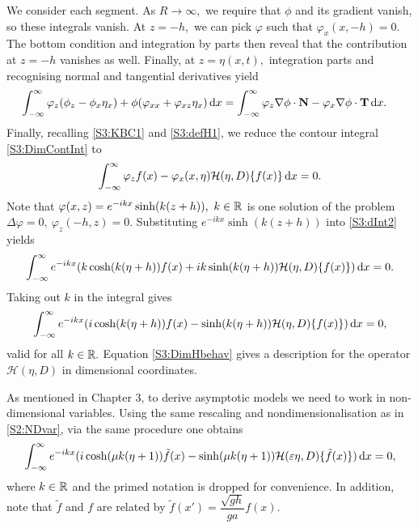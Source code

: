 We consider each segment. As $R \to \infty,$ we require that $\phi$ and its gradient vanish, so these integrals vanish. At $z = -h,$ we can pick $\varphi$ such that $\varphi_x(x, -h) = 0.$ The bottom condition and integration by parts then reveal that the contribution at $z = - h$ vanishes as well. Finally, at $z = \eta(x,t),$ integration parts and recognising normal and tangential derivatives yield
\begin{align*}
\int_{-\infty}^{\infty} \varphi_z(\phi_z &- \phi_x \eta_x) + \phi(\varphi_{xx}  +  \varphi_{xz} \eta_x) \,\mathrm{d} x = \int_{-\infty}^{\infty} \varphi_z \nabla \phi \cdot {\bf N} -\varphi_x \nabla \phi \cdot {\bf T} \,\mathrm{d} x.
\end{align*}
Finally, recalling \eqref{S3:KBC1} and \eqref{S3:defH1}, we reduce the contour integral \eqref{S3:DimContInt} to
\begin{equation}\label{S3:dInt2}
\int_{-\infty}^{\infty} \varphi_z f(x) -\varphi_x(x, \eta) \mathcal{H}( \eta, D)\{ f(x) \} \,\mathrm{d} x = 0.
\end{equation}
Note that $\varphi(x,z) = e^{-ikx} \sinh(k(z+h)), ~ k \in \mathbb R$ is one solution of the problem $\Delta \varphi = 0, ~ \varphi_z(-h,z) = 0.$ Substituting $e^{-ikx} \sinh(k(z+h))$ into
\eqref{S3:dInt2} yields
\begin{equation}\label{S3:DimHbehav2}
\int_{-\infty}^{\infty} e^{-ikx}( k \cosh(k(\eta+h)) f(x) + ik \sinh(k(\eta+h)) \mathcal{H}( \eta, D)\{ f(x) \}) \,\mathrm{d} x = 0.
\end{equation}
Taking out $k$ in the integral gives
\begin{equation}\label{S3:DimHbehav}
\int_{-\infty}^{\infty} e^{-ikx}( i  \cosh(k(\eta+h)) f(x) - \sinh(k(\eta+h)) \mathcal{H}( \eta, D)\{ f(x) \}) \,\mathrm{d} x = 0,
\end{equation}
valid for all $k \in \mathbb R.$ Equation \eqref{S3:DimHbehav} gives a description for the operator $\mathcal{H}( \eta, D)$ in dimensional coordinates. 


As mentioned in Chapter 3, to derive asymptotic models we need to work in non-dimensional variables. Using the same rescaling and nondimensionalisation as in \eqref{S2:NDvar}, via the same procedure one obtains
\begin{equation}\label{S3:NDimHbehav}
\int_{-\infty}^{\infty} e^{-ikx}( i  \cosh(\mu k(\eta+1)) \tilde{f}(x) - \sinh(\mu k(\eta+1)) \mathcal{H}( \varepsilon \eta, D)\{ \tilde{f}(x)  \}) \,\mathrm{d} x = 0, 
\end{equation}
where $k \in \mathbb R$ and the primed notation is dropped for convenience. In addition, note that $\tilde{f}$ and $f$ are related by $\tilde{f}(x') = \dfrac{\sqrt{gh}}{ga}f(x).$

